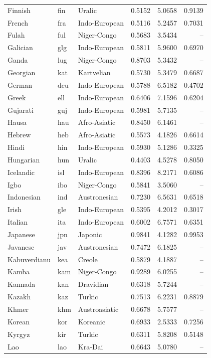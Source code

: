 \begin{longtable}{p{3.1cm}p{0.9cm}p{2.7cm}rrr}
Finnish & fin & Uralic & 0.5152 & 5.0658 & 0.9139\\
French & fra & Indo-European & 0.5116 & 5.2457 & 0.7031\\
Fulah & ful & Niger-Congo & 0.5683 & 3.5434 & --\\
Galician & glg & Indo-European & 0.5811 & 5.9600 & 0.6970\\
Ganda & lug & Niger-Congo & 0.8703 & 5.3432 & --\\
Georgian & kat & Kartvelian & 0.5730 & 5.3479 & 0.6687\\
German & deu & Indo-European & 0.5788 & 6.5182 & 0.4702\\
Greek & ell & Indo-European & 0.6406 & 7.1596 & 0.6204\\
Gujarati & guj & Indo-European & 0.5981 & 5.7135 & --\\
Hausa & hau & Afro-Asiatic & 0.8450 & 6.1461 & --\\
Hebrew & heb & Afro-Asiatic & 0.5573 & 4.1826 & 0.6614\\
Hindi & hin & Indo-European & 0.5930 & 5.1286 & 0.3325\\
Hungarian & hun & Uralic & 0.4403 & 4.5278 & 0.8050\\
Icelandic & isl & Indo-European & 0.8396 & 8.2171 & 0.6086\\
Igbo & ibo & Niger-Congo & 0.5841 & 3.5060 & --\\
Indonesian & ind & Austronesian & 0.7230 & 6.5631 & 0.6518\\
Irish & gle & Indo-European & 0.5395 & 4.2012 & 0.3017\\
Italian & ita & Indo-European & 0.6002 & 6.7571 & 0.6351\\
Japanese & jpn & Japonic & 0.9841 & 4.1282 & 0.9953\\
Javanese & jav & Austronesian & 0.7472 & 6.1825 & --\\
Kabuverdianu & kea & Creole & 0.5879 & 4.1887 & --\\
Kamba & kam & Niger-Congo & 0.9289 & 6.0255 & --\\
Kannada & kan & Dravidian & 0.6318 & 5.7244 & --\\
Kazakh & kaz & Turkic & 0.7513 & 6.2231 & 0.8879\\
Khmer & khm & Austroasiatic & 0.6678 & 5.7577 & --\\
Korean & kor & Koreanic & 0.6933 & 2.5333 & 0.7256\\
Kyrgyz & kir & Turkic & 0.6311 & 5.8208 & 0.5148\\
Lao & lao & Kra-Dai & 0.6643 & 5.0780 & --\\

\end{longtable}
